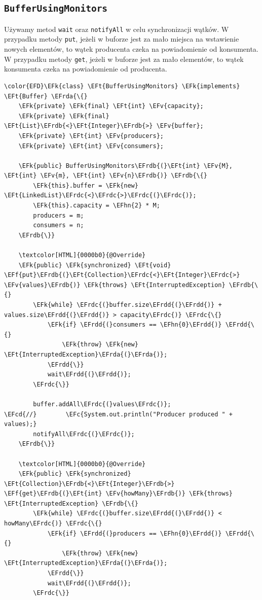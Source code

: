 \documentclass[11pt]{article}
\newcommand{\EFc}[1]{\textcolor{EFc}{\textit{#1}}} %
\newcommand{\EFcd}[1]{\textcolor{EFcd}{\textit{#1}}} %
\newcommand{\EFk}[1]{\textcolor{EFk}{#1}} %
\newcommand{\EFf}[1]{\textcolor{EFf}{#1}} %
\newcommand{\EFv}[1]{\textcolor{EFv}{#1}} %
\newcommand{\EFt}[1]{\textcolor{EFt}{#1}} %
\newcommand{\EFhn}[1]{\textcolor{EFhn}{#1}} %
\newcommand{\EFrda}[1]{#1} %
\newcommand{\EFrdb}[1]{\textcolor{EFrdb}{#1}} %
\newcommand{\EFrdc}[1]{\textcolor{EFrdc}{#1}} %
\newcommand{\EFrdd}[1]{\textcolor{EFrdd}{#1}} %
\begin{document}
\subsection*{\texttt{BufferUsingMonitors}}
\label{sec:orgcad74b0}
Używamy metod \texttt{wait} oraz \texttt{notifyAll} w celu synchronizacji wątków. W przypadku
metody \texttt{put}, jeżeli w buforze jest za mało miejsca na wstawienie nowych elementów,
to wątek producenta czeka na powiadomienie od konsumenta. W przypadku metody \texttt{get},
jeżeli w buforze jest za mało elementów, to wątek konsumenta czeka na powiadomienie
od producenta.

\begin{Code}
\begin{Verbatim}
\color{EFD}\EFk{class} \EFt{BufferUsingMonitors} \EFk{implements} \EFt{Buffer} \EFrda{\{}
    \EFk{private} \EFk{final} \EFt{int} \EFv{capacity};
    \EFk{private} \EFk{final} \EFt{List}\EFrdb{<}\EFt{Integer}\EFrdb{>} \EFv{buffer};
    \EFk{private} \EFt{int} \EFv{producers};
    \EFk{private} \EFt{int} \EFv{consumers};

    \EFk{public} BufferUsingMonitors\EFrdb{(}\EFt{int} \EFv{M}, \EFt{int} \EFv{m}, \EFt{int} \EFv{n}\EFrdb{)} \EFrdb{\{}
        \EFk{this}.buffer = \EFk{new} \EFt{LinkedList}\EFrdc{<}\EFrdc{>}\EFrdc{(}\EFrdc{)};
        \EFk{this}.capacity = \EFhn{2} * M;
        producers = m;
        consumers = n;
    \EFrdb{\}}

    \textcolor[HTML]{0000b0}{@Override}
    \EFk{public} \EFk{synchronized} \EFt{void} \EFf{put}\EFrdb{(}\EFt{Collection}\EFrdc{<}\EFt{Integer}\EFrdc{>} \EFv{values}\EFrdb{)} \EFk{throws} \EFt{InterruptedException} \EFrdb{\{}
        \EFk{while} \EFrdc{(}buffer.size\EFrdd{(}\EFrdd{)} + values.size\EFrdd{(}\EFrdd{)} > capacity\EFrdc{)} \EFrdc{\{}
            \EFk{if} \EFrdd{(}consumers == \EFhn{0}\EFrdd{)} \EFrdd{\{}
                \EFk{throw} \EFk{new} \EFt{InterruptedException}\EFrda{(}\EFrda{)};
            \EFrdd{\}}
            wait\EFrdd{(}\EFrdd{)};
        \EFrdc{\}}

        buffer.addAll\EFrdc{(}values\EFrdc{)};
\EFcd{//}        \EFc{System.out.println("Producer produced " + values);}
        notifyAll\EFrdc{(}\EFrdc{)};
    \EFrdb{\}}

    \textcolor[HTML]{0000b0}{@Override}
    \EFk{public} \EFk{synchronized} \EFt{Collection}\EFrdb{<}\EFt{Integer}\EFrdb{>} \EFf{get}\EFrdb{(}\EFt{int} \EFv{howMany}\EFrdb{)} \EFk{throws} \EFt{InterruptedException} \EFrdb{\{}
        \EFk{while} \EFrdc{(}buffer.size\EFrdd{(}\EFrdd{)} < howMany\EFrdc{)} \EFrdc{\{}
            \EFk{if} \EFrdd{(}producers == \EFhn{0}\EFrdd{)} \EFrdd{\{}
                \EFk{throw} \EFk{new} \EFt{InterruptedException}\EFrda{(}\EFrda{)};
            \EFrdd{\}}
            wait\EFrdd{(}\EFrdd{)};
        \EFrdc{\}}



\end{Verbatim}
\end{Code}
\end{document}
